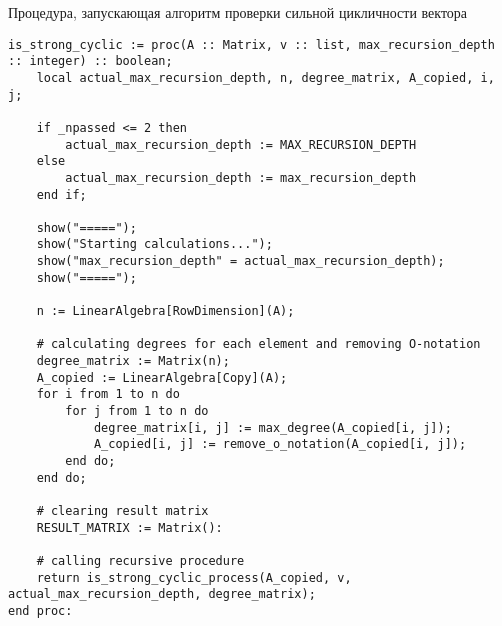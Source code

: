 \bigskip
Процедура, запускающая алгоритм проверки сильной цикличности вектора
\begin{lstlisting}[basicstyle=\scriptsize]
is_strong_cyclic := proc(A :: Matrix, v :: list, max_recursion_depth :: integer) :: boolean;
    local actual_max_recursion_depth, n, degree_matrix, A_copied, i, j;
    
    if _npassed <= 2 then
        actual_max_recursion_depth := MAX_RECURSION_DEPTH
    else
        actual_max_recursion_depth := max_recursion_depth
    end if;
    
    show("=====");
    show("Starting calculations...");
    show("max_recursion_depth" = actual_max_recursion_depth);
    show("=====");
    
    n := LinearAlgebra[RowDimension](A);
    
    # calculating degrees for each element and removing O-notation
    degree_matrix := Matrix(n);
    A_copied := LinearAlgebra[Copy](A);
    for i from 1 to n do
        for j from 1 to n do
            degree_matrix[i, j] := max_degree(A_copied[i, j]);
            A_copied[i, j] := remove_o_notation(A_copied[i, j]);
        end do;
    end do;
    
    # clearing result matrix
    RESULT_MATRIX := Matrix():
    
    # calling recursive procedure
    return is_strong_cyclic_process(A_copied, v, actual_max_recursion_depth, degree_matrix);
end proc:
\end{lstlisting}


